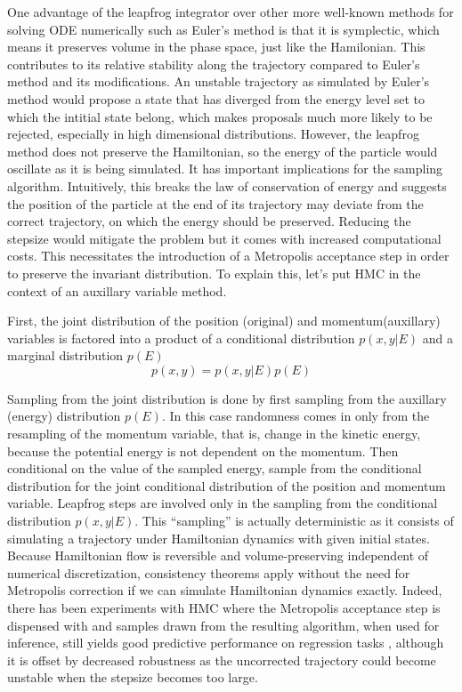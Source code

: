 \documentclass{book}
\begin{document}
\begin{enumerate}
One advantage of the leapfrog integrator over other more well-known methods for
solving ODE numerically such as Euler's method is that it is symplectic, which
means it preserves volume in the phase space, just like the Hamilonian. This
contributes to its relative stability along the trajectory compared to Euler's
method and its modifications. An unstable trajectory as simulated by Euler's
method would propose a state that has diverged from the energy level set to
which the intitial state belong, which makes proposals much more likely to be
rejected, especially in high dimensional distributions.  However,
the leapfrog method does not preserve the Hamiltonian, so the energy of the particle would
oscillate as it is being simulated. It has important implications for the
sampling algorithm. Intuitively, this breaks the law of conservation of energy
and suggests the position of the particle at the end of its trajectory may
deviate from the correct trajectory, on which the energy should be preserved.
Reducing the stepsize would mitigate the problem but it comes with increased
computational costs. This necessitates the introduction of a Metropolis
acceptance step in order to preserve the invariant distribution. To explain
this, let's put HMC in the context of an auxillary variable method. 

First, the joint distribution of the position (original) and momentum(auxillary)
variables is factored into a product of a conditional distribution $p(x,y|E)$ and a
marginal distribution $p(E)$
\[ p(x,y) = p(x,y|E)p(E) \]

Sampling from the joint distribution is done by first sampling from the
auxillary (energy) distribution $p(E)$. In this case randomness comes in only from the
resampling of the momentum variable, that is, change in the kinetic energy,
because the potential energy is not dependent on the momentum. Then conditional on the value of the
sampled energy, sample from the conditional distribution for the joint
conditional distribution of the position and momentum variable. Leapfrog steps
are involved only in the sampling from the conditional distribution $p(x,y|E)$.
This ``sampling'' is actually deterministic as it consists of simulating a
trajectory under Hamiltonian dynamics with given initial states. Because
Hamiltonian flow is reversible and volume-preserving independent of numerical
discretization, consistency theorems apply without the need for Metropolis
correction if we can simulate Hamiltonian dynamics exactly. Indeed, there has
been experiments with HMC where the Metropolis acceptance step is dispensed with
and samples drawn from the resulting algorithm, when used for inference, still yields good predictive
performance on regression tasks \cite{neal1993bayesian}, although it is offset
by
decreased robustness as the uncorrected trajectory could become unstable when
the stepsize becomes too large. 



\end{enumerate}
\end{document}
